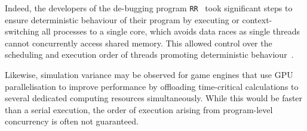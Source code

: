 \documentclass[letterpaper, 10 pt, journal, twoside]{IEEEtran}
\begin{document}
Indeed, the developers of the de-bugging program \texttt{RR}~\cite{RR_link} took significant steps to ensure deterministic behaviour of their program by executing or context-switching all processes to a single core, which avoids data races as single threads cannot concurrently access shared memory. This allowed control over the scheduling and execution order of threads promoting deterministic behaviour~\cite{acm-q-rr-interview}.
%

Likewise, simulation variance may be observed for game engines that use GPU parallelisation to improve performance by offloading time-critical calculations to several dedicated computing resources simultaneously. While this would be faster than a serial execution, the order of execution arising from program-level concurrency is often not guaranteed. 
\end{document}

